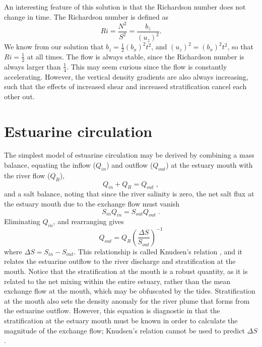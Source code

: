\documentclass[11pt]{report}
\numberwithin{equation}{section}
\begin{document}
An interesting feature of this solution is that the Richardson number does not change in time.  The Richardson number is defined as
\begin{equation}
    Ri = \frac{N^2}{S^2} = \frac{b_z}{(u_z)^2}.
\end{equation}
We know from our solution that $b_z = \frac{1}{2}(b_x)^2 t^2$, and $(u_z)^2 = (b_x)^2 t^2$, so that $Ri=\frac{1}{2}$ at all times.  The flow is always stable, since the Richardson number is always larger than $\frac{1}{4}$.  This may seem curious since the flow is constantly accelerating.  However, the vertical density gradients are also always increasing, such that the effects of increased shear and increased stratification cancel each other out.



\section{Estuarine circulation}

The simplest model of estuarine circulation may be derived by combining a mass balance, equating the inflow ($Q_{in}$) and outflow ($Q_{out}$) at the estuary mouth with the river flow ($Q_R$),
\begin{equation}
    Q_{in} + Q_R = Q_{out} \; ,
\end{equation}
and a salt balance, noting that since the river salinity is zero, the net salt flux at the estuary mouth due to the exchange flow must vanish
\begin{equation}
    S_{in} Q_{in} = S_{out} Q_{out} \; .
\end{equation}
Eliminating $Q_{in}$, and rearranging gives
\begin{equation}
    Q_{out} = Q_R \left( \frac{\Delta S}{S_{out}} \right)^{-1}
\end{equation}
where $\Delta S = S_{in} - S_{out}$.  This relationship is called Knudsen's relation \citep{knudsen:00}, and it relates the estuarine outflow to the river discharge and stratification at the mouth.  Notice that the stratification at the mouth is a robust quantity, as it is related to the net mixing within the entire estuary, rather than the mean exchange flow at the mouth, which may be obfuscated by the tides.  Stratification at the mouth also sets the density anomaly for the river plume that forms from the estuarine outflow.  However, this equation is diagnostic in that the stratification at the estuary mouth must be known in order to calculate the magnitude of the exchange flow; Knudsen's relation cannot be used to predict $\Delta S$.
\end{document}
